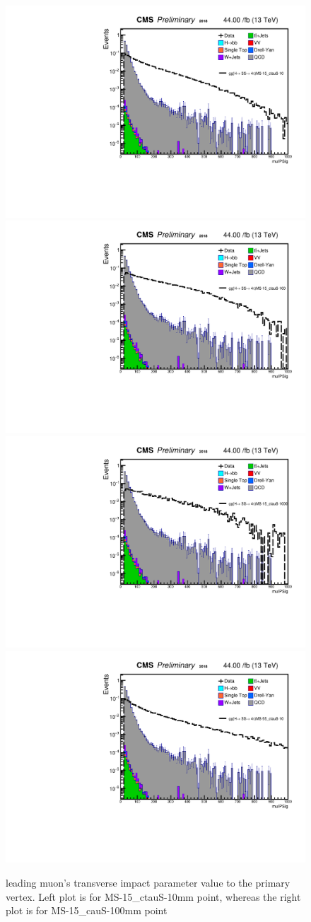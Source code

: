  \begin{figure}[h!]
   \label{fig:leadmuIP}
   \centering
   \includegraphics[width=0.47\linewidth]{figs/log_Oct6ANVars_MS-15_ctauS-10_muIPSig.pdf}
   \includegraphics[width=0.47\linewidth]{figs/log_Oct6ANVars_MS-15_ctauS-100_muIPSig.pdf}
   \includegraphics[width=0.47\linewidth]{figs/log_Oct6ANVars_MS-15_ctauS-1000_muIPSig.pdf}
   \includegraphics[width=0.47\linewidth]{figs/log_Oct6ANVars_MS-55_ctauS-10_muIPSig.pdf}
   \caption{leading muon's transverse impact parameter value to the primary vertex. Left plot is for MS-15\_ctauS-10mm point, whereas the right plot is for MS-15\_cauS-100mm point}
 \end{figure}

